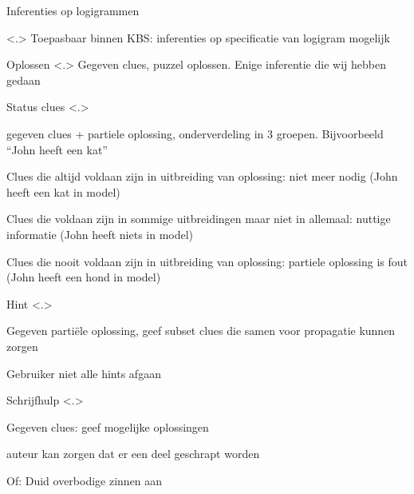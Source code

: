 \documentclass[notes, dvipsnames]{beamer}
\newcommand{\hitem}{
	\ppause
	\item
}
\newcommand{\ppause}{\onslide<+>}
\newcommand{\nnote}[1]{\note<.>{#1}}
\begin{document}
	\begin{frame}{Inferenties op logigrammen}
		\begin{itemize}
      \ppause
      \nnote{
        Toepasbaar binnen KBS: inferenties op specificatie van logigram mogelijk
      }
      \hitem Oplossen
      \nnote{
        Gegeven clues, puzzel oplossen. Enige inferentie die wij hebben gedaan
      }
      \hitem Status clues
      \nnote{
        gegeven clues + partiele oplossing, onderverdeling in 3 groepen. Bijvoorbeeld ``John heeft een kat''
        \item Clues die altijd voldaan zijn in uitbreiding van oplossing: niet meer nodig (John heeft een kat in model)
        \item Clues die voldaan zijn in sommige uitbreidingen maar niet in allemaal: nuttige informatie (John heeft niets in model)
        \item Clues die nooit voldaan zijn in uitbreiding van oplossing: partiele oplossing is fout (John heeft een hond in model)
      }
      \hitem Hint
      \nnote{
        Gegeven partiële oplossing, geef subset clues die samen voor propagatie kunnen zorgen
        \item Gebruiker niet alle hints afgaan
      }
      \hitem Schrijfhulp
      \nnote{
        Gegeven clues: geef mogelijke oplossingen
        \item auteur kan zorgen dat er een deel geschrapt worden
        \item Of: Duid overbodige zinnen aan
      }
		\end{itemize}
	\end{frame}
	
\end{document}
